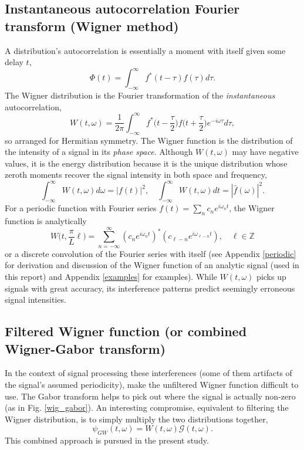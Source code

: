 \documentclass{article}
\begin{document}
\subsection{Instantaneous autocorrelation Fourier transform (Wigner method)}
A distribution's autocorrelation is essentially a moment with itself given some delay $t$,
\begin{equation}
  \Phi(t) = \int_{-\infty}^\infty f^*(t-\tau)f(\tau)d\tau.
\end{equation}
The Wigner distribution is the Fourier transformation of the \textit{instantaneous} autocorrelation,
\begin{equation}
  W(t,\omega) = \frac{1}{2\pi}\int_{-\infty}^\infty f^*\Big(t - \frac{\tau}{2}\Big)f\Big(t + \frac{\tau}{2}\Big)e^{-i\omega\tau}d\tau,\label{wig}
\end{equation}
so arranged for Hermitian symmetry. The Wigner function is the distribution of the intensity of a signal in its \textit{phase space}. Although $W(t,\omega)$ may have negative values, it is the energy distribution because it is the unique distribution whose zeroth moments recover the signal intensity in both space and frequency,
\begin{equation}
  \int_{-\infty}^\infty W(t,\omega)d\omega = |f(t)|^2,\quad \int_{-\infty}^\infty W(t,\omega)dt = |\hat{f}(\omega)|^2.
\end{equation}
For a periodic function with Fourier series $f(t) = \sum_n c_ne^{i\omega_nt}$, the Wigner function is analytically
\begin{equation}
  W\Big(t,\frac{\pi}{L}\ell\Big) = \sum_{n=-\infty}^\infty(c_ne^{i\omega_nt})^*(c_{\ell-n}e^{i\omega_{\ell - n}t}),\quad \ell\in\mathbb{Z}
\end{equation}
or a discrete convolution of the Fourier series with itself (see Appendix \ref{periodic} for derivation and discussion of the Wigner function of an analytic signal (used in this report) and Appendix \ref{examples} for examples). While $W(t,\omega)$ picks up signals with great accuracy, its interference patterns predict seemingly erroneous signal intensities.

\subsection{Filtered Wigner function (or combined Wigner-Gabor transform)}
In the context of signal processing these interferences (some of them artifacts of the signal's assumed periodicity), make the unfiltered Wigner function difficult to use. The Gabor transform helps to pick out where the signal is actually non-zero (as in Fig. \ref{wig_gabor}). An interesting compromise, equivalent to filtering the Wigner distribution, is to simply multiply the two distributions together,
\begin{equation}
  \psi_{GW}(t,\omega) = W(t,\omega)\mathcal{G}(t,\omega).
\end{equation}
This combined approach is pursued in the present study.
\end{document}
